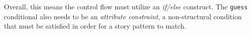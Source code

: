 Overall, this means the control flow must utilize an \emph{if/else} construct. The \texttt{guess} conditional also needs to be an \emph{attribute
constraint}, a non-structural condition that must be satisfied in order for a story pattern to match. 


